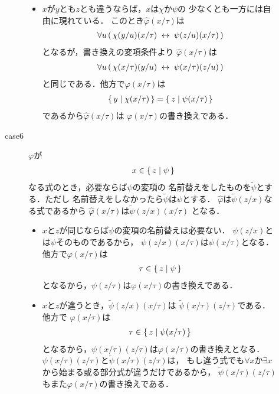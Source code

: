 \begin{metaprf}
\begin{description}
\begin{description}
\begin{itemize}
							\item $x$が$y$とも$z$とも違うならば，$x$は$\chi$か$\psi$の
								少なくとも一方には自由に現れている．
								このとき$\widehat{\varphi}(x/\tau)$は
								\begin{align}
									\forall u\, (\, \chi(y/u)(x/\tau) \hspace{0.25em}\leftrightarrow\hspace{0.25em} \psi(z/u)(x/\tau)\, )
								\end{align}
								となるが，書き換えの変項条件より
								$\widehat{\varphi}(x/\tau)$は
								\begin{align}
									\forall u\, (\, \chi(x/\tau)(y/u) \hspace{0.25em}\leftrightarrow\hspace{0.25em} \psi(x/\tau)(z/u)\, )
								\end{align}
								と同じである．他方で$\varphi(x/\tau)$は
								\begin{align}
									\{\, y \mid \chi(x/\tau)\, \} = \{\, z \mid \psi(x/\tau)\, \}
								\end{align}
								であるから$\widehat{\varphi}(x/\tau)$は
								$\varphi(x/\tau)$の書き換えである．
						\end{itemize}
						
					\item[case6] $\varphi$が
						\begin{align}
							x \in \{\, z \mid \psi\, \}
						\end{align}
						なる式のとき，必要ならば$\psi$の変項の
						名前替えをしたものを$\widetilde{\psi}$とする．ただし
						名前替えをしなかったら$\widetilde{\psi}$は$\psi$とする．
						$\widehat{\varphi}$は$\widetilde{\psi}(z/x)$なる式であるから
						$\widehat{\varphi}(x/\tau)$は$\widetilde{\psi}(z/x)(x/\tau)$
						となる．
						\begin{itemize}
							\item $x$と$z$が同じならば$\psi$の変項の名前替えは必要ない．
								$\psi(z/x)$とは$\psi$そのものであるから，
								$\psi(z/x)(x/\tau)$は$\psi(x/\tau)$となる．
								他方で$\varphi(x/\tau)$は
								\begin{align}
									\tau \in \{\, z \mid \psi\, \}
								\end{align}
								となるから，$\psi(z/\tau)$は$\varphi(x/\tau)$の書き換えである．
								
							\item $x$と$z$が違うとき，$\widetilde{\psi}(z/x)(x/\tau)$は
								$\widetilde{\psi}(x/\tau)(z/\tau)$である．他方で
								$\varphi(x/\tau)$は
								\begin{align}
									\tau \in \{\, z \mid \psi(x/\tau)\, \}
								\end{align}
								となるから，$\psi(x/\tau)(z/\tau)$は$\varphi(x/\tau)$の書き換えとなる．
								$\psi(x/\tau)(z/\tau)$と$\widetilde{\psi}(x/\tau)(z/\tau)$は，
								もし違う式でも$\forall x$か$\exists x$から始まる或る部分式が違うだけであるから，
								$\widetilde{\psi}(x/\tau)(z/\tau)$もまた$\varphi(x/\tau)$の書き換えである．
						\end{itemize}
						

\end{description}
\end{description}
\end{metaprf}
